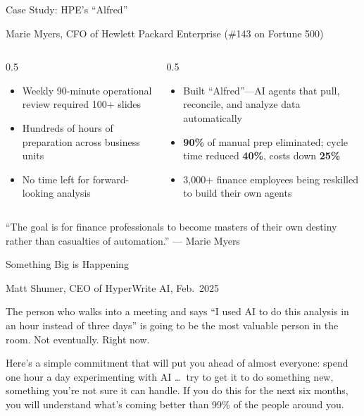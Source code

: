 \documentclass[aspectratio=169]{beamer}
\begin{document}
\begin{frame}[shrink=5]{Case Study: HPE's ``Alfred''}
\centerline{Marie Myers, CFO of Hewlett Packard Enterprise (\#143 on Fortune 500)}
\vspace{0.2cm}
\begin{columns}[T]
\begin{column}{0.5\textwidth}
\begin{shadedbox}[title=\textbf{The Problem}]
\begin{itemize}\small
  \item Weekly 90-minute operational review required 100+ slides
  \item Hundreds of hours of preparation across business units
  \item No time left for forward-looking analysis
\end{itemize}
\end{shadedbox}
\end{column}
\begin{column}{0.5\textwidth}
\begin{shadedbox}[title=\textbf{The AI Solution}]
\begin{itemize}\small
  \item Built ``Alfred''---AI agents that pull, reconcile, and analyze data automatically
  \item \textbf{90\%} of manual prep eliminated; cycle time reduced \textbf{40\%}, costs down \textbf{25\%}
  \item 3,000+ finance employees being reskilled to build their own agents
\end{itemize}
\end{shadedbox}
\end{column}
\end{columns}
\vspace{0.2cm}
\centering
``The goal is for finance professionals to become \alert{masters of their own destiny} rather than casualties of automation.'' --- Marie Myers
\end{frame}

\begin{frame}{Something Big is Happening}
\centerline{Matt Shumer, CEO of HyperWrite AI, Feb.\ 2025}

The person who walks into a meeting and says ``I used AI to do this analysis in an hour instead of three days'' is going to be the most valuable person in the room. Not eventually. Right now.

\bigskip

Here's a simple commitment that will put you ahead of almost everyone: spend one hour a day experimenting with AI \ldots\ try to get it to do something new, something you're not sure it can handle. If you do this for the next six months, you will understand what's coming better than 99\% of the people around you.
\end{frame}
\end{document}
